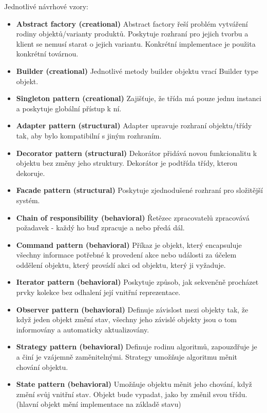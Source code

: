 Jednotlivé návrhové vzory:
\begin{itemize}
  \item \textbf{Abstract factory (creational)} Abstract factory řeší problém vytváření rodiny objektů/varianty produktů. Poskytuje rozhraní pro jejich tvorbu a klient se nemusí starat o jejich variantu. Konkrétní implementace je použita konkrétní továrnou.
  \item \textbf{Builder (creational)} Jednotlivé metody builder objektu vrací Builder type objekt.
  \item \textbf{Singleton pattern (creational)} Zajišťuje, že třída má pouze jednu instanci a poskytuje globální přístup k ní. 
  \item \textbf{Adapter pattern (structural)} Adapter upravuje rozhraní objektu/třídy tak, aby bylo kompatibilní s jiným rozhraním.
  \item \textbf{Decorator pattern (structural)} Dekorátor přidává novou funkcionalitu k objektu bez změny jeho struktury. Dekorátor je podtřída třídy, kterou dekoruje.
  \item \textbf{Facade pattern (structural)} Poskytuje zjednodušené rozhraní pro složitější systém.
  \item \textbf{Chain of responsibility (behavioral)} Řetězec zpracovatelů zpracovává požadavek - každý ho buď zpracuje a nebo předá dál.
  \item \textbf{Command pattern (behavioral)} Příkaz je objekt, který encapsuluje všechny informace potřebné k provedení akce nebo události za účelem oddělení objektu, který provádí akci od objektu, který ji vyžaduje.
  \item \textbf{Iterator pattern (behavioral)} Poskytuje způsob, jak sekvenčně procházet prvky kolekce bez odhalení její vnitřní reprezentace.
  \item \textbf{Observer pattern (behavioral)} Definuje závislost mezi objekty tak, že když jeden objekt změní stav, všechny jeho závislé objekty jsou o tom informovány a automaticky aktualizovány.
  \item \textbf{Strategy pattern (behavioral)} Definuje rodinu algoritmů, zapouzdřuje je a činí je vzájemně zaměnitelnými. Strategy umožňuje algoritmu měnit chování objektu.
  \item \textbf{State pattern (behavioral)} Umožňuje objektu měnit jeho chování, když změní svůj vnitřní stav. Objekt bude vypadat, jako by změnil svou třídu. (hlavní objekt mění implementace na základě stavu)
\end{itemize}

